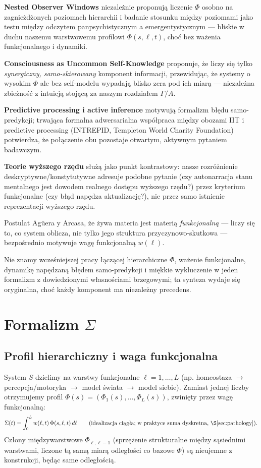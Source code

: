 \documentclass[11pt]{article}
\begin{document}
\textbf{Nested Observer Windows} \cite{fink2024} niezależnie proponują liczenie $\Phi$ osobno na zagnieżdżonych poziomach hierarchii i badanie stosunku między poziomami jako testu między odczytem panpsychistycznym a emergentystycznym --- bliskie w duchu naszemu warstwowemu profilowi $\Phi(s,\ell,t)$, choć bez ważenia funkcjonalnego i dynamiki.

\textbf{Consciousness as Uncommon Self-Knowledge} \cite{usk2026} proponuje, że liczy się tylko \emph{synergiczny, samo-skierowany} komponent informacji, przewidując, że systemy o wysokim $\Phi$ ale bez self-modelu wypadają blisko zera pod ich miarą --- niezależna zbieżność z intuicją stojącą za naszym rozdziałem $\Gamma/A$.

\textbf{Predictive processing i active inference} \cite{friston2010,deane2021} motywują formalizm błędu samo-predykcji; trwająca formalna adwersarialna współpraca między obozami IIT i predictive processing (INTREPID, Templeton World Charity Foundation) potwierdza, że połączenie obu pozostaje otwartym, aktywnym pytaniem badawczym.

\textbf{Teorie wyższego rzędu} \cite{rosenthal2005} służą jako punkt kontrastowy: nasze rozróżnienie deskryptywne/konstytutywne adresuje podobne pytanie (czy autonarracja stanu mentalnego jest dowodem realnego dostępu wyższego rzędu?) przez kryterium funkcjonalne (czy błąd napędza aktualizację?), nie przez samo istnienie reprezentacji wyższego rzędu.

Postulat Ag\"uera y Arcasa, że żywa materia jest materią \emph{funkcjonalną} --- liczy się to, co system oblicza, nie tylko jego struktura przyczynowo-skutkowa --- bezpośrednio motywuje wagę funkcjonalną $w(\ell)$.

Nie znamy wcześniejszej pracy łączącej hierarchiczne $\Phi$, ważenie funkcjonalne, dynamikę napędzaną błędem samo-predykcji i miękkie wykluczenie w jeden formalizm z dowiedzionymi własnościami brzegowymi; ta synteza wydaje się oryginalna, choć każdy komponent ma niezależny precedens.

\section{Formalizm $\Sigma$}

\subsection{Profil hierarchiczny i waga funkcjonalna}
System $S$ dzielimy na warstwy funkcjonalne $\ell=1,\dots,L$ (np. homeostaza $\to$ percepcja/motoryka $\to$ model świata $\to$ model siebie). Zamiast jednej liczby otrzymujemy profil $\Phi(s)=(\Phi_1(s),\dots,\Phi_L(s))$, zwinięty przez wagę funkcjonalną:
\[
\Sigma(t) = \int_0^L w(\ell,t)\,\Phi(s,\ell,t)\,d\ell \qquad \text{(idealizacja ciągła; w praktyce suma dyskretna, \S\ref{sec:pathology})}.
\]
Człony międzywarstwowe $\Phi_{\ell,\ell-1}$ (sprzężenie strukturalne między sąsiednimi warstwami, liczone tą samą miarą odległości co bazowe $\Phi$) są nieujemne z konstrukcji, będąc same odległością.
\end{document}
